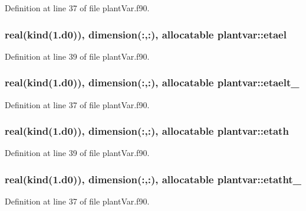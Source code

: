 Definition at line 37 of file plant\-Var.\-f90.

\hypertarget{classplantvar_a147383d8988f7f269a7a8ef91e174332}{
\subsubsection[{etael}]{\setlength{\rightskip}{0pt plus 5cm}real(kind(1.d0)), dimension(\-:,\-:), allocatable plantvar\-::etael}}\label{classplantvar_a147383d8988f7f269a7a8ef91e174332}


Definition at line 39 of file plant\-Var.\-f90.

\hypertarget{classplantvar_a1411b8ad84d3bd06274ccdd65f678303}{
\subsubsection[{etaelt\-\_\-}]{\setlength{\rightskip}{0pt plus 5cm}real(kind(1.d0)), dimension(\-:,\-:), allocatable plantvar\-::etaelt\-\_\-}}\label{classplantvar_a1411b8ad84d3bd06274ccdd65f678303}


Definition at line 37 of file plant\-Var.\-f90.

\hypertarget{classplantvar_af7b5f83a54b793676f6b4838a1b50957}{
\subsubsection[{etath}]{\setlength{\rightskip}{0pt plus 5cm}real(kind(1.d0)), dimension(\-:,\-:), allocatable plantvar\-::etath}}\label{classplantvar_af7b5f83a54b793676f6b4838a1b50957}


Definition at line 39 of file plant\-Var.\-f90.

\hypertarget{classplantvar_a96d49c1ab61a68186579469ada973e8d}{
\subsubsection[{etatht\-\_\-}]{\setlength{\rightskip}{0pt plus 5cm}real(kind(1.d0)), dimension(\-:,\-:), allocatable plantvar\-::etatht\-\_\-}}\label{classplantvar_a96d49c1ab61a68186579469ada973e8d}


Definition at line 37 of file plant\-Var.\-f90.

